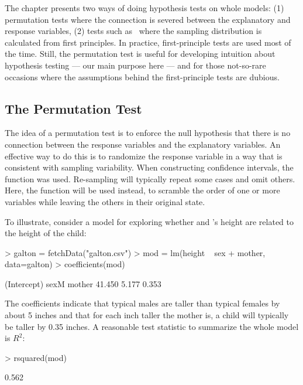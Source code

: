 



The chapter presents two ways of doing hypothesis tests on whole
models: (1) permutation tests where the connection is severed between
the explanatory and response variables, (2) tests such as \ANOVA\
where the sampling distribution is calculated from first principles.
In practice, first-principle tests are used most of the time.
Still, the permutation test is useful for developing intuition about
hypothesis testing --- our main purpose here --- 
and for those not-so-rare occasions where the assumptions
behind the first-principle tests are dubious.

\subsection{The Permutation Test}

The idea of a permutation test is to enforce the null hypothesis that
there is no connection between the response variables and the
explanatory variables.  An effective way to do this is to randomize
the response variable in a way that is consistent with sampling
variability.  When constructing confidence intervals, the
 function was used.  Re-sampling will typically
repeat some cases and omit others.  Here, the \function{shuffle}
function will be used instead, to scramble the order of one or more
variables while leaving the others in their original state.


To illustrate, consider a model for exploring whether  and
\VN{mother}'s height are related to the height of the child: \datasetGalton
\begin{Schunk}
\begin{Sinput}
> galton = fetchData("galton.csv")
> mod = lm(height ~ sex + mother, data=galton)
> coefficients(mod)
\end{Sinput}
\begin{Soutput}
(Intercept)        sexM      mother 
     41.450       5.177       0.353 
\end{Soutput}
\end{Schunk}
The coefficients indicate that typical males are taller than typical 
females by about 5 inches and that for each inch taller the mother is,
a child will typically be taller by 0.35 inches.  
A reasonable test statistic to summarize the whole model is $R^2$:
\begin{Schunk}
\begin{Sinput}
> rsquared(mod)
\end{Sinput}
\begin{Soutput}
[1] 0.562
\end{Soutput}
\end{Schunk}

